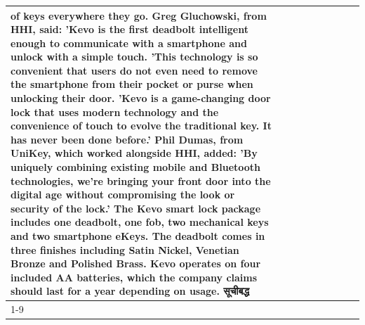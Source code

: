 \begin{table}[H]
\begin{tabular}{lllrlllll}
of keys everywhere they go. Greg Gluchowski, from HHI, said: 'Kevo is the first deadbolt intelligent enough to communicate with a smartphone and unlock with a simple touch. 'This technology is so convenient that users do not even need to remove the smartphone from their pocket or purse when unlocking their door. 'Kevo is a game-changing door lock that uses modern technology and the convenience of touch to evolve the traditional key. It has never been done before.' Phil Dumas, from UniKey, which worked alongside HHI, added: 'By uniquely combining existing mobile and Bluetooth technologies, we’re bringing your front door into the digital age without compromising the look or security of the lock.' The Kevo smart lock package includes one deadbolt, one fob, two mechanical keys and two smartphone eKeys. The deadbolt comes in three finishes including Satin Nickel, Venetian Bronze and Polished Brass. Kevo operates on four included AA batteries, which the company claims should last for a year depending on usage. सूचीबद्ध \\
\cline{1-9}

\end{tabular}
\end{table}
